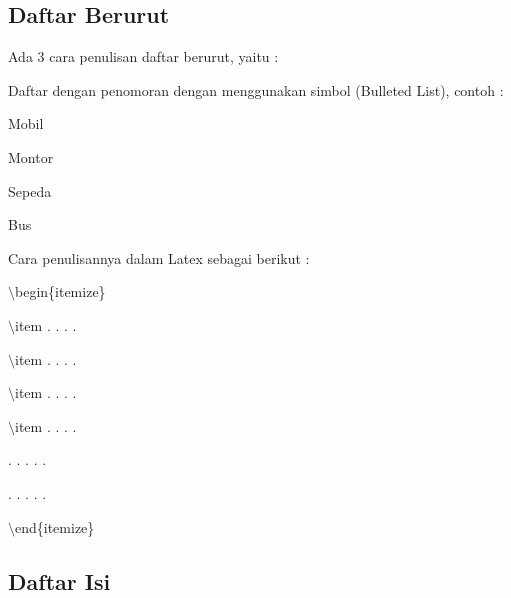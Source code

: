\subsection {Daftar Berurut}\par \vspace{12pt}

Ada 3 cara penulisan daftar berurut, yaitu :

Daftar dengan penomoran dengan menggunakan simbol (Bulleted List), contoh :

Mobil\par \vspace{12pt}

Montor\par \vspace{12pt}

Sepeda\par \vspace{12pt}

Bus\par \vspace{12pt}

Cara penulisannya dalam Latex sebagai berikut :\par \vspace{12pt}

$\setminus$begin\{itemize\}\par \vspace{12pt}

$\setminus$item . . . .\par \vspace{12pt}

$\setminus$item . . . .\par \vspace{12pt}

$\setminus$item . . . .\par \vspace{12pt}

$\setminus$item . . . .\par \vspace{12pt}

. . . . .

. . . . .\par \vspace{12pt}

$\setminus$end\{itemize\}\par \vspace{12pt}



\subsection {Daftar Isi}\par \vspace{12pt}


